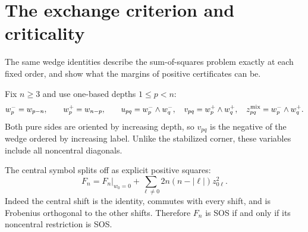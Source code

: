 \section{The exchange criterion and criticality}\label{sec:exchange}
The same wedge identities describe the sum-of-squares problem exactly
at each fixed order, and show what the margins of positive certificates
can be.

Fix $n\ge3$ and use one-based depths $1\le p<n$:
\[
 w_p^-=w_{p-n},\qquad w_p^+=w_{n-p},\qquad
 u_{pq}=w_p^-\wedge w_q^-,\quad v_{pq}=w_p^+\wedge w_q^+,\quad
 z^{\rm mix}_{pq}=w_p^-\wedge w_q^+.
\]
Both pure sides are oriented by increasing depth, so $v_{pq}$ is the
negative of the wedge ordered by increasing label. Unlike the stabilized
corner, these variables include all noncentral diagonals.

The central symbol splits off as explicit positive squares:
\begin{equation}\label{eq:center}
 F_n=F_n|_{w_0=0}+
       \sum_{\ell\ne0}2n(n-|\ell|)z_{0\ell}^2.
\end{equation}
Indeed the central shift is the identity, commutes with every shift,
and is Frobenius orthogonal to the other shifts. Therefore $F_n$ is
SOS if and only if its noncentral restriction is SOS.

